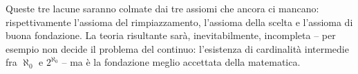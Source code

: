 Queste tre lacune saranno colmate dai tre assiomi che ancora ci mancano: rispettivamente l'assioma del rimpiazzamento, l'assioma della scelta e l'assioma di buona fondazione. La teoria risultante sar\`a,
inevitabilmente, incompleta -- per esempio non decide il problema del continuo: l'esistenza di cardinalit\`a intermedie fra $\aleph_0$ e $2^{\aleph_0}$ -- ma \`e la fondazione meglio accettata della matematica.
